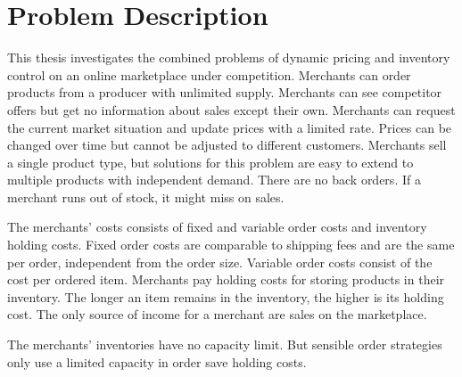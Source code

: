 
\chapter{Problem Description}
This thesis investigates the combined problems of dynamic pricing and inventory control on an online marketplace under competition.
Merchants can order products from a producer with unlimited supply. 
Merchants can see competitor offers but get no information about sales except their own.
Merchants can request the current market situation and update prices with a limited rate.
Prices can be changed over time but cannot be adjusted to different customers.
Merchants sell a single product type, but solutions for this problem are easy to extend to multiple products with independent demand.
There are no back orders. If a merchant runs out of stock, it might miss on sales.

The merchants' costs consists of fixed and variable order costs and inventory holding costs.
Fixed order costs are comparable to shipping fees and are the same per order, independent from the order size.
Variable order costs consist of the cost per ordered item.
Merchants pay holding costs for storing products in their inventory.
The longer an item remains in the inventory, the higher is its holding cost. 
The only source of income for a merchant are sales on the marketplace.

The merchants' inventories have no capacity limit.
But sensible order strategies only use a limited capacity in order save holding costs.



